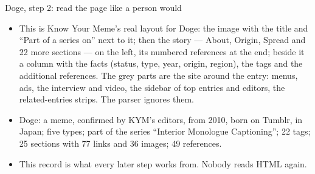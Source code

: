 \begin{frame}{Doge, step 2: read the page like a person would}
{\begin{itemize}
    \item This is Know Your Meme's real layout for Doge: the image with the title and ``Part of a
      series on'' next to it; then the story --- About, Origin, Spread and 22 more sections ---
      on the left, its numbered references at the end; beside it a column with the facts (status,
      type, year, origin, region), the tags and the additional references. The grey parts are the
      site around the entry: menus, ads, the interview and video, the sidebar of top entries and
      editors, the related-entries strips. The parser ignores them.
    \item Doge: a meme, confirmed by KYM's editors, from 2010, born on Tumblr, in Japan; five
      types; part of the series ``Interior Monologue Captioning''; 22 tags; 25 sections with 77
      links and 36 images; 49 references.
    \item This record is what every later step works from. Nobody reads HTML again.
  \end{itemize}}
\end{frame}

